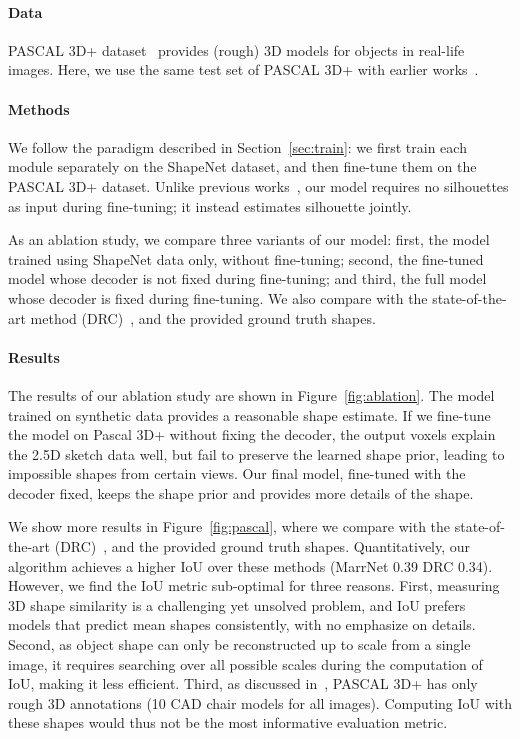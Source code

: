 \documentclass{article}
\newcommand{\sect}[1]{Section~\ref{#1}}
\newcommand{\fig}[1]{Figure~\ref{#1}}
\newcommand{\myparagraph}[1]{\vspace{-3pt}\paragraph{#1}}
\begin{document}
\paragraph{Data} 
PASCAL 3D+ dataset~\citep{Xiang2014} provides (rough) 3D models for objects in real-life images. Here, we use the same test set of PASCAL 3D+ with earlier works~\citep{tulsiani2017multi}.

\myparagraph{Methods}
We follow the paradigm described in \sect{sec:train}: we first train each module separately on the ShapeNet dataset, and then fine-tune them on the PASCAL 3D+ dataset. Unlike previous works~\citep{tulsiani2017multi}, our model requires no silhouettes as input during fine-tuning; it instead estimates silhouette jointly. 

As an ablation study, we compare three variants of our model: first, the model trained using ShapeNet data only, without fine-tuning; second, the fine-tuned model whose decoder is not fixed during fine-tuning; and third, the full model whose decoder is fixed during fine-tuning. We also compare with the state-of-the-art method (DRC)~\citep{tulsiani2017multi}, and the provided ground truth shapes.

\myparagraph{Results}
The results of our ablation study are shown in \fig{fig:ablation}. The model trained on synthetic data provides a reasonable shape estimate. If we fine-tune the model on Pascal 3D+ without fixing the decoder, the output voxels explain the 2.5D sketch data well, but fail to preserve the learned shape prior, leading to impossible shapes from certain views. Our final model, fine-tuned with the decoder fixed, keeps the shape prior and provides more details of the shape. 

We show more results in \fig{fig:pascal}, where we compare with the state-of-the-art (DRC)~\citep{tulsiani2017multi}, and the provided ground truth shapes. Quantitatively, our algorithm achieves a higher IoU over these methods (MarrNet 0.39 \vs DRC 0.34). However, we find the IoU metric sub-optimal for three reasons. First, measuring 3D shape similarity is a challenging yet unsolved problem, and IoU prefers models that predict mean shapes consistently, with no emphasize on details. Second, as object shape can only be reconstructed up to scale from a single image, it requires searching over all possible scales during the computation of IoU, making it less efficient. Third, as discussed in~\cite{tulsiani2017multi}, PASCAL 3D+ has only rough 3D annotations (10 CAD chair models for all images). Computing IoU with these shapes would thus not be the most informative evaluation metric. 
\end{document}
